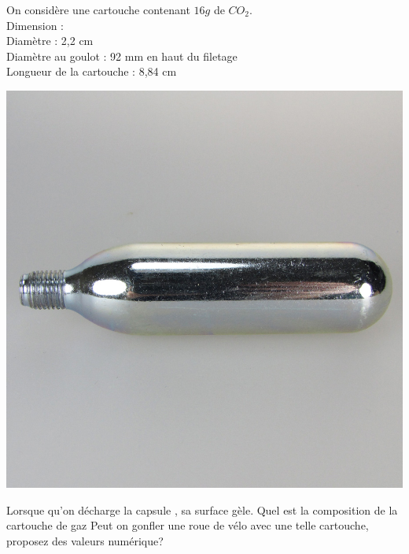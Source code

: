\begin{Exercise}[title=Cartouche pour vélo]
  \begin{minipage}{0.7\linewidth}
    On considère une cartouche  contenant $16 g$ de $CO_2$.\\
    Dimension : \\
    Diamètre : 2,2 cm \\
    Diamètre au goulot : 92 mm en haut du filetage \\
    Longueur de la cartouche : 8,84 cm \\
  \end{minipage}\hspace{.05\linewidth}
  \begin{minipage}{0.2\textwidth}
    \includegraphics[width=\linewidth]{../fig/cartouche.jpg}
  \end{minipage}

  Lorsque qu'on décharge la capsule , sa surface gèle.
  \Question Quel est la composition de la cartouche de gaz
  \Question Peut on gonfler une roue de vélo avec une telle cartouche, proposez des valeurs numérique?
\end{Exercise}
